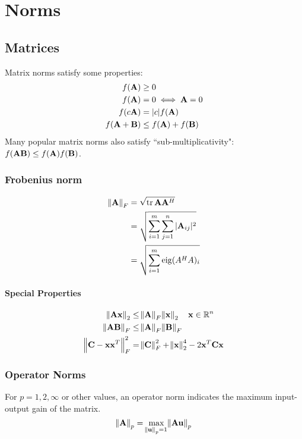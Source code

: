 \chapter{Norms}

\section{Matrices}
Matrix norms satisfy some properties:
\begin{align}
f(\mathbf{A})    &\ge 0             \\
f(\mathbf{A})    &=   0  \iff \mathbf{A}=0 \\
f(c\mathbf{A})   &=   |c|f(\mathbf{A})     \\
f(\mathbf{A}+\mathbf{B})&\le f(\mathbf{A})+f(\mathbf{B})
\end{align}
Many popular matrix norms also satisfy ``sub-multiplicativity": $f(\mathbf{A}\mathbf{B})\le f(\mathbf{A})f(\mathbf{B})$.

\subsection{Frobenius norm}
\begin{align}
\norm{\mathbf{A}}_F &= \sqrt{\operatorname{tr}\mathbf{A}\mathbf{A}^H}                           \\
             &= \sqrt{\sum_{i=1}^m \sum_{j=1}^n |\mathbf{A}_{ij}|^2 }  \\
             &= \sqrt{\sum_{i=1}^m \operatorname{eig}(A^H A)_i }
\end{align}

\subsubsection{Special Properties}
\begin{align}
\norm{\mathbf{A}\mathbf{x}}_2         &\le \norm{\mathbf{A}}_F \norm{\mathbf{x}}_2~~~\mathbf{x}\in\mathbb{R}^{n} \\
\norm{\mathbf{A}\mathbf{B}}_F         &\le \norm{\mathbf{A}}_F \norm{\mathbf{B}}_F \\
\norm{\mathbf{C}-\mathbf{x}\mathbf{x}^T}_F^2 &= \norm{\mathbf{C}}_F^2+\norm{\mathbf{x}}_2^4-2 \mathbf{x}^T \mathbf{C} \mathbf{x}
\end{align}

\subsection{Operator Norms}
For $p=1,2,\infty$ or other values, an operator norm indicates the maximum input-output gain of the matrix.
\begin{equation}
\norm{\mathbf{A}}_p=\max_{\norm{\mathbf{u}}_p=1} \norm{\mathbf{A}\mathbf{u}}_p
\end{equation}

